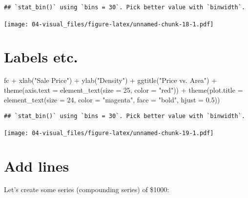 \documentclass[
]{book}
\newenvironment{Shaded}{\begin{snugshade}}{\end{snugshade}}
\newcommand{\AttributeTok}[1]{\textcolor[rgb]{0.77,0.63,0.00}{#1}}
\newcommand{\DecValTok}[1]{\textcolor[rgb]{0.00,0.00,0.81}{#1}}
\newcommand{\FloatTok}[1]{\textcolor[rgb]{0.00,0.00,0.81}{#1}}
\newcommand{\FunctionTok}[1]{\textcolor[rgb]{0.00,0.00,0.00}{#1}}
\newcommand{\NormalTok}[1]{#1}
\newcommand{\SpecialCharTok}[1]{\textcolor[rgb]{0.00,0.00,0.00}{#1}}
\newcommand{\StringTok}[1]{\textcolor[rgb]{0.31,0.60,0.02}{#1}}
\begin{document}
\begin{verbatim}
## `stat_bin()` using `bins = 30`. Pick better value with `binwidth`.
\end{verbatim}

\texttt{[image: 04-visual\_files/figure-latex/unnamed-chunk-18-1.pdf]}

\hypertarget{labels-etc.}{%
\section{Labels etc.}\label{labels-etc.}}

\begin{Shaded}
\begin{Highlighting}[]
\NormalTok{fc }\SpecialCharTok{+} 
  \FunctionTok{xlab}\NormalTok{(}\StringTok{"Sale Price"}\NormalTok{) }\SpecialCharTok{+} 
  \FunctionTok{ylab}\NormalTok{(}\StringTok{"Density"}\NormalTok{) }\SpecialCharTok{+} 
  \FunctionTok{ggtitle}\NormalTok{(}\StringTok{"Price vs. Area"}\NormalTok{) }\SpecialCharTok{+}
  \FunctionTok{theme}\NormalTok{(}\AttributeTok{axis.text =} \FunctionTok{element\_text}\NormalTok{(}\AttributeTok{size =} \DecValTok{25}\NormalTok{, }\AttributeTok{color =} \StringTok{"red"}\NormalTok{)) }\SpecialCharTok{+}
  \FunctionTok{theme}\NormalTok{(}\AttributeTok{plot.title =} \FunctionTok{element\_text}\NormalTok{(}\AttributeTok{size =} \DecValTok{24}\NormalTok{, }
                                     \AttributeTok{color =} \StringTok{"magenta"}\NormalTok{, }
                                     \AttributeTok{face =} \StringTok{"bold"}\NormalTok{,}
                                     \AttributeTok{hjust =} \FloatTok{0.5}\NormalTok{)) }
\end{Highlighting}
\end{Shaded}

\begin{verbatim}
## `stat_bin()` using `bins = 30`. Pick better value with `binwidth`.
\end{verbatim}

\texttt{[image: 04-visual\_files/figure-latex/unnamed-chunk-19-1.pdf]}

\hypertarget{add-lines}{%
\section{Add lines}\label{add-lines}}

Let's create some series (compounding series) of \$1000:
\end{document}
